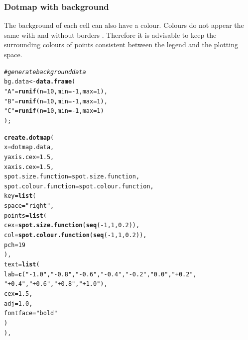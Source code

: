 \documentclass[letterpaper]{report}\usepackage[]{graphicx}\usepackage[]{color}
\makeatletter
\newcommand{\hlnum}[1]{\textcolor[rgb]{0.686,0.059,0.569}{#1}}%
\newcommand{\hlstr}[1]{\textcolor[rgb]{0.192,0.494,0.8}{#1}}%
\newcommand{\hlcom}[1]{\textcolor[rgb]{0.678,0.584,0.686}{\textit{#1}}}%
\newcommand{\hlopt}[1]{\textcolor[rgb]{0,0,0}{#1}}%
\newcommand{\hlstd}[1]{\textcolor[rgb]{0.345,0.345,0.345}{#1}}%
\newcommand{\hlkwb}[1]{\textcolor[rgb]{0.69,0.353,0.396}{#1}}%
\newcommand{\hlkwc}[1]{\textcolor[rgb]{0.333,0.667,0.333}{#1}}%
\newcommand{\hlkwd}[1]{\textcolor[rgb]{0.737,0.353,0.396}{\textbf{#1}}}%
\newenvironment{kframe}{%
 \def\at@end@of@kframe{}%
 \ifinner\ifhmode%
  \def\at@end@of@kframe{\end{minipage}}%
  \begin{minipage}{\columnwidth}%
 \fi\fi%
 \def\FrameCommand##1{\hskip\@totalleftmargin \hskip-\fboxsep
 \colorbox{shadecolor}{##1}\hskip-\fboxsep
     \hskip-\linewidth \hskip-\@totalleftmargin \hskip\columnwidth}%
 \MakeFramed {\advance\hsize-\width
   \@totalleftmargin\z@ \linewidth\hsize
   \@setminipage}}%
 {\par\unskip\endMakeFramed%
 \at@end@of@kframe}
\newenvironment{knitrout}{}{} %
\makeatother
\begin{document}
\subsubsection{Dotmap with background}
The background of each cell can also have a colour. Colours do not appear the same with and without borders \cite{brewer-colour}. Therefore it is advisable to keep the surrounding colours of points consistent between the legend and the plotting space.

\begin{knitrout}
\color{fgcolor}\begin{kframe}
\begin{alltt}
\hlcom{# generate background data}
\hlstd{bg.data} \hlkwb{<-} \hlkwd{data.frame}\hlstd{(}
    \hlstr{"A"} \hlstd{=} \hlkwd{runif}\hlstd{(}\hlkwc{n} \hlstd{=} \hlnum{10}\hlstd{,} \hlkwc{min} \hlstd{=} \hlopt{-}\hlnum{1}\hlstd{,} \hlkwc{max} \hlstd{=} \hlnum{1}\hlstd{),}
    \hlstr{"B"} \hlstd{=} \hlkwd{runif}\hlstd{(}\hlkwc{n} \hlstd{=} \hlnum{10}\hlstd{,} \hlkwc{min} \hlstd{=} \hlopt{-}\hlnum{1}\hlstd{,} \hlkwc{max} \hlstd{=} \hlnum{1}\hlstd{),}
    \hlstr{"C"} \hlstd{=} \hlkwd{runif}\hlstd{(}\hlkwc{n} \hlstd{=} \hlnum{10}\hlstd{,} \hlkwc{min} \hlstd{=} \hlopt{-}\hlnum{1}\hlstd{,} \hlkwc{max} \hlstd{=} \hlnum{1}\hlstd{)}
    \hlstd{);}

\hlkwd{create.dotmap}\hlstd{(}
    \hlkwc{x} \hlstd{= dotmap.data,}
    \hlkwc{yaxis.cex} \hlstd{=} \hlnum{1.5}\hlstd{,}
    \hlkwc{xaxis.cex} \hlstd{=} \hlnum{1.5}\hlstd{,}
    \hlkwc{spot.size.function} \hlstd{= spot.size.function,}
    \hlkwc{spot.colour.function} \hlstd{= spot.colour.function,}
    \hlkwc{key} \hlstd{=} \hlkwd{list}\hlstd{(}
        \hlkwc{space} \hlstd{=} \hlstr{"right"}\hlstd{,}
        \hlkwc{points} \hlstd{=} \hlkwd{list}\hlstd{(}
            \hlkwc{cex} \hlstd{=} \hlkwd{spot.size.function}\hlstd{(}\hlkwd{seq}\hlstd{(}\hlopt{-}\hlnum{1}\hlstd{,} \hlnum{1}\hlstd{,} \hlnum{0.2}\hlstd{)),}
            \hlkwc{col} \hlstd{=} \hlkwd{spot.colour.function}\hlstd{(}\hlkwd{seq}\hlstd{(}\hlopt{-}\hlnum{1}\hlstd{,} \hlnum{1}\hlstd{,} \hlnum{0.2}\hlstd{)),}
            \hlkwc{pch} \hlstd{=} \hlnum{19}
            \hlstd{),}
        \hlkwc{text} \hlstd{=} \hlkwd{list}\hlstd{(}
            \hlkwc{lab} \hlstd{=} \hlkwd{c}\hlstd{(}\hlstr{"-1.0"}\hlstd{,} \hlstr{"-0.8"}\hlstd{,} \hlstr{"-0.6"}\hlstd{,} \hlstr{"-0.4"}\hlstd{,} \hlstr{"-0.2"}\hlstd{,} \hlstr{" 0.0"}\hlstd{,} \hlstr{"+0.2"}\hlstd{,}
                \hlstr{"+0.4"}\hlstd{,} \hlstr{"+0.6"}\hlstd{,} \hlstr{"+0.8"}\hlstd{,} \hlstr{"+1.0"}\hlstd{),}
            \hlkwc{cex} \hlstd{=} \hlnum{1.5}\hlstd{,}
            \hlkwc{adj} \hlstd{=} \hlnum{1.0}\hlstd{,}
            \hlkwc{fontface} \hlstd{=} \hlstr{"bold"}
            \hlstd{)}
        \hlstd{),}


\end{alltt}
\end{kframe}
\end{knitrout}
\end{document}
